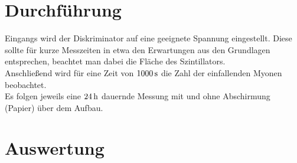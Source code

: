 \documentclass[numbers=noenddot,12pt,a4paper]{scrartcl}
\begin{document}
\section{Durchführung}
Eingangs wird der Diskriminator auf eine geeignete Spannung eingestellt. Diese sollte für kurze Messzeiten in etwa den Erwartungen aus den Grundlagen entsprechen, beachtet man dabei die Fläche des Szintillators.\\
Anschließend wird für eine Zeit von $\unit[1000]{s}$ die Zahl der einfallenden Myonen beobachtet.\\
Es folgen jeweils eine $\unit[24]{h}$ dauernde Messung mit und ohne Abschirmung (Papier) über dem Aufbau.
\newpage
\section{Auswertung}
\end{document}
